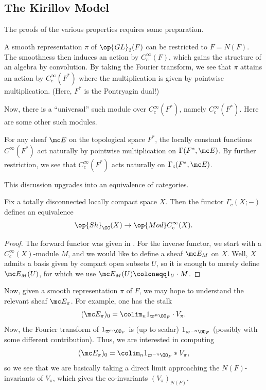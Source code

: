 \documentclass[../notes.tex]{subfiles}
\begin{document}
\subsection{The Kirillov Model}
The proofs of the various properties requires some preparation.
\begin{remark}
	A smooth representation $\pi$ of $\op{GL}_2(F)$ can be restricted to $F=N(F)$. The smoothness then induces an action by $C_c^\infty(F)$, which gains the structure of an algebra by convolution. By taking the Fourier transform, we see that $\pi$ attains an action by $C_c^\infty(F^*)$ where the multiplication is given by pointwise multiplication. (Here, $F^*$ is the Pontryagin dual!)
\end{remark}
Now, there is a ``universal'' such module over $C_c^\infty(F^*)$, namely $C_c^\infty(F^*)$. Here are some other such modules.
\begin{example} \label{ex:sheaf-to-cc-mod}
	For any sheaf $\mc E$ on the topological space $F^*$, the locally constant functions $C^\infty(F^*)$ act naturally by pointwise multiplication on $\Gamma(F^*,\mc E)$. By further restriction, we see that $C^\infty_c(F^*)$ acts naturally on $\Gamma_c(F^*,\mc E)$.
\end{example}
This discussion upgrades into an equivalence of categories.
\begin{proposition}
	Fix a totally disconnected locally compact space $X$. Then the functor $\Gamma_c(X;-)$ defines an equivalence
	\[\op{Sh}_\CC(X)\to\op{Mod}C_c^\infty(X).\]
\end{proposition}
\begin{proof}
	The forward functor was given in . For the inverse functor, we start with a $C_c^\infty(X)$-module $M$, and we would like to define a sheaf $\mc E_M$ on $X$. Well, $X$ admits a basis given by compact open subsets $U$, so it is enough to merely define $\mc E_M(U)$, for which we use $\mc E_M(U)\coloneqq 1_U\cdot M$.
\end{proof}
Now, given a smooth representation $\pi$ of $F$, we may hope to understand the relevant sheaf $\mc E_\pi$. For example, one has the stalk
\[(\mc E_\pi)_0=\colim_n1_{\varpi^n\OO_F}\cdot V_\pi.\]
Now, the Fourier transform of $1_{\varpi^n\OO_F}$ is (up to scalar) $1_{\varpi^{-n}\OO_F}$ (possibly with some different contribution). Thus, we are interested in computing
\[(\mc E_\pi)_0=\colim_n1_{\varpi^{-n}\OO_F}*V_\pi,\]
so we see that we are basically taking a direct limit approaching the $N(F)$-invariants of $V_\pi$, which gives the co-invariants $(V_\pi)_{N(F)}$.
\end{document}
